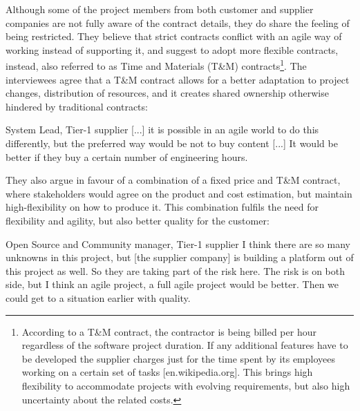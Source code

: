 Although some of the project members from both customer and supplier companies are not fully aware of the contract details, they do share the feeling of being restricted. 
%
%
They believe that strict contracts conflict with an agile way of working instead of supporting it, and suggest to adopt more flexible contracts, instead, also referred to as Time and Materials (T\&M) contracts\footnote{According to a T\&M contract, the contractor is being billed per hour regardless of the software project duration. If any additional features have to be developed the supplier charges just for the time spent by its employees working on a certain set of tasks [en.wikipedia.org]. This brings high flexibility to accommodate projects with evolving requirements, but also high uncertainty about the related costs.}. 
The interviewees agree that a T\&M contract allows for a better adaptation to project changes, distribution of resources, and it creates shared ownership otherwise hindered by traditional contracts:

\begin{aquote}{System Lead, Tier-1 supplier}
[...] it is possible in an agile world to do this differently, but the preferred way would be not to buy content [...] %
It would be better if they buy a certain number of engineering hours.
\end{aquote}

They also argue in favour of a combination of a fixed price and T\&M contract, where stakeholders would agree on the product and cost estimation, but maintain high-flexibility on how to produce it. This combination fulfils the need for flexibility and agility, but also better quality for the customer:

\begin{aquote}{Open Source and Community manager, Tier-1 supplier}
I think there are so many unknowns in this project, but [the supplier company] is building a platform out of this project as well. So they are taking part of the risk here. The risk is on both side, but I think an agile project, a full agile project would be better. Then we could get to a situation earlier with quality.
\end{aquote}

